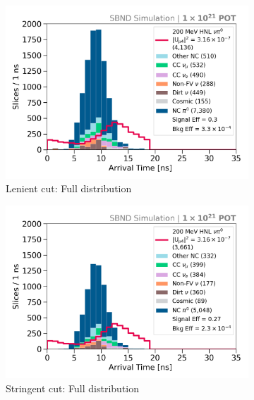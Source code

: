 \begin{figure}[ht!]
	\hfill
	\begin{subfigure}[b]{0.495\textwidth}   
            \centering 
            \includegraphics[width=\textwidth]{bb_lenient_full}
            \caption{Lenient cut: Full distribution}%
	    \label{fig:bb_full_loose}
        \end{subfigure}
        \hfill
	\begin{subfigure}[b]{0.495\textwidth}   
            \centering 
            \includegraphics[width=\textwidth]{bb_stringent_full}
            \caption{Stringent cut: Full distribution}%
	    \label{fig:bb_full_strict}
        \end{subfigure}
	\hfill
        \begin{subfigure}[b]{0.495\textwidth}   

\end{subfigure}
\end{figure}
